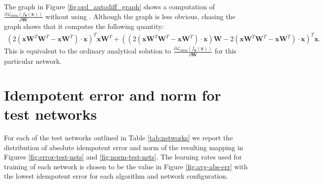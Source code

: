\documentclass{article}
\theoremstyle{plain}
\theoremstyle{definition}
\theoremstyle{remark}
\newcommand{\vx}{\mathbf{x}}
\newcommand{\vW}{\mathbf{W}}
\newcommand{\vtheta}{\bm{\theta}}
\newcommand{\pd}[2]{\frac{\partial{#1}}{\partial{#2}}}
\begin{document}
The graph in Figure \ref{fig:ord_autodiff_graph} shows a computation of $\pd{\mathcal{L}_{\mathrm{idem}}(f_{\vtheta}(\vx))}{\vW}$ without using . Although the graph is less obvious, chasing the graph shows that it computes the following quantity:
%
\begin{align*}
    (2(\vx\vW^T\vW^T-\vx\vW^T) \cdot \vx)^T \vx\vW^T + ((2(\vx\vW^T\vW^T-\vx\vW^T) \cdot \vx) \vW - 2(\vx\vW^T\vW^T-\vx\vW^T) \cdot \vx)^T \vx.
\end{align*}
%
This is equivalent to the ordinary analytical solution to $\pd{\mathcal{L}_{\mathrm{idem}}(f_{\vtheta}(\vx))}{\vW}$ for this particular network.

\newpage
\section{Idempotent error and norm for test networks}
\label{app:test-networks-data}

For each of the test networks outlined in Table \ref{tab:networks} we report the distribution of absolute idempotent error and norm of the resulting mapping in Figures \ref{fig:error-test-nets} and \ref{fig:norm-test-nets}. The learning rates used for training of each network is chosen to be the value in Figure \ref{fig:avg-abs-err} with the lowest idempotent error for each algorithm and network configuration.
\end{document}
